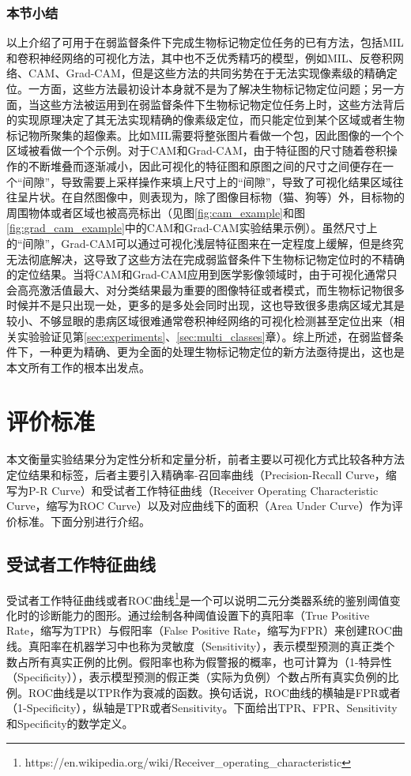 \subsubsection{本节小结}\label{subsec:related_work_summary}
以上介绍了可用于在弱监督条件下完成生物标记物定位任务的已有方法，包括MIL和卷积神经网络的可视化方法，其中也不乏优秀精巧的模型，例如MIL、反卷积网络、CAM、Grad-CAM，但是这些方法的共同劣势在于无法实现像素级的精确定位。一方面，这些方法最初设计本身就不是为了解决生物标记物定位问题；另一方面，当这些方法被运用到在弱监督条件下生物标记物定位任务上时，这些方法背后的实现原理决定了其无法实现精确的像素级定位，而只能定位到某个区域或者生物标记物所聚集的超像素。比如MIL需要将整张图片看做一个包，因此图像的一个个区域被看做一个个示例。对于CAM和Grad-CAM，由于特征图的尺寸随着卷积操作的不断堆叠而逐渐减小，因此可视化的特征图和原图之间的尺寸之间便存在一个“间隙”，导致需要上采样操作来填上尺寸上的“间隙”，导致了可视化结果区域往往呈片状。在自然图像中，则表现为，除了图像目标物（猫、狗等）外，目标物的周围物体或者区域也被高亮标出（见图\ref{fig:cam_example}和图\ref{fig:grad_cam_example}中的CAM和Grad-CAM实验结果示例）。虽然尺寸上的“间隙”，Grad-CAM可以通过可视化浅层特征图来在一定程度上缓解，但是终究无法彻底解决，这导致了这些方法在完成弱监督条件下生物标记物定位时的不精确的定位结果。当将CAM和Grad-CAM应用到医学影像领域时，由于可视化通常只会高亮激活值最大、对分类结果最为重要的图像特征或者模式，而生物标记物很多时候并不是只出现一处，更多的是多处会同时出现，这也导致很多患病区域尤其是较小、不够显眼的患病区域很难通常卷积神经网络的可视化检测甚至定位出来（相关实验验证见第\ref{sec:experiments}、\ref{sec:multi_classes}章）。综上所述，在弱监督条件下，一种更为精确、更为全面的处理生物标记物定位的新方法亟待提出，这也是本文所有工作的根本出发点。
\section{评价标准}
本文衡量实验结果分为定性分析和定量分析，前者主要以可视化方式比较各种方法定位结果和标签，后者主要引入精确率-召回率曲线（Precision-Recall Curve，缩写为P-R Curve）和受试者工作特征曲线（Receiver Operating Characteristic Curve，缩写为ROC Curve）以及对应曲线下的面积（Area Under Curve）作为评价标准。下面分别进行介绍。
\subsection{受试者工作特征曲线}\label{subsec:roc_curve}
受试者工作特征曲线或者ROC曲线\footnote{https://en.wikipedia.org/wiki/Receiver\_operating\_characteristic}是一个可以说明二元分类器系统的鉴别阈值变化时的诊断能力的图形。通过绘制各种阈值设置下的真阳率（True Positive Rate，缩写为TPR）与假阳率（False Positive Rate，缩写为FPR）来创建ROC曲线。真阳率在机器学习中也称为灵敏度（Sensitivity），表示模型预测的真正类个数占所有真实正例的比例。假阳率也称为假警报的概率，也可计算为（1-特异性（Specificity）），表示模型预测的假正类（实际为负例）个数占所有真实负例的比例。ROC曲线是以TPR作为衰减的函数。换句话说，ROC曲线的横轴是FPR或者（1-Specificity），纵轴是TPR或者Sensitivity。下面给出TPR、FPR、Sensitivity和Specificity的数学定义。

